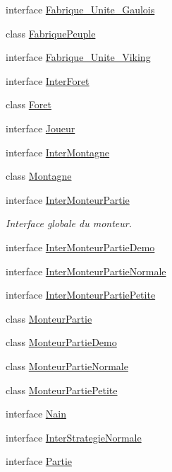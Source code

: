 \begin{DoxyCompactItemize}
interface \hyperlink{interface_small_world_1_1_fabrique___unite___gaulois}{Fabrique\-\_\-\-Unite\-\_\-\-Gaulois}
\item 
class \hyperlink{class_small_world_1_1_fabrique_peuple}{Fabrique\-Peuple}
\item 
interface \hyperlink{interface_small_world_1_1_fabrique___unite___viking}{Fabrique\-\_\-\-Unite\-\_\-\-Viking}
\item 
interface \hyperlink{interface_small_world_1_1_inter_foret}{Inter\-Foret}
\item 
class \hyperlink{class_small_world_1_1_foret}{Foret}
\item 
interface \hyperlink{interface_small_world_1_1_joueur}{Joueur}
\item 
interface \hyperlink{interface_small_world_1_1_inter_montagne}{Inter\-Montagne}
\item 
class \hyperlink{class_small_world_1_1_montagne}{Montagne}
\item 
interface \hyperlink{interface_small_world_1_1_inter_monteur_partie}{Inter\-Monteur\-Partie}
\begin{DoxyCompactList}\small\item\em Interface globale du monteur. \end{DoxyCompactList}\item 
interface \hyperlink{interface_small_world_1_1_inter_monteur_partie_demo}{Inter\-Monteur\-Partie\-Demo}
\item 
interface \hyperlink{interface_small_world_1_1_inter_monteur_partie_normale}{Inter\-Monteur\-Partie\-Normale}
\item 
interface \hyperlink{interface_small_world_1_1_inter_monteur_partie_petite}{Inter\-Monteur\-Partie\-Petite}
\item 
class \hyperlink{class_small_world_1_1_monteur_partie}{Monteur\-Partie}
\item 
class \hyperlink{class_small_world_1_1_monteur_partie_demo}{Monteur\-Partie\-Demo}
\item 
class \hyperlink{class_small_world_1_1_monteur_partie_normale}{Monteur\-Partie\-Normale}
\item 
class \hyperlink{class_small_world_1_1_monteur_partie_petite}{Monteur\-Partie\-Petite}
\item 
interface \hyperlink{interface_small_world_1_1_nain}{Nain}
\item 
interface \hyperlink{interface_small_world_1_1_inter_strategie_normale}{Inter\-Strategie\-Normale}
\item 
interface \hyperlink{interface_small_world_1_1_partie}{Partie}

\end{DoxyCompactItemize}
